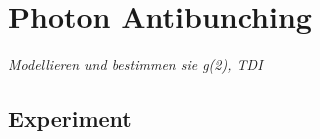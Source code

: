 

\chapter{Photon Antibunching}



\textit{Modellieren und bestimmen sie g(2), TDI
}
\section{Experiment}

 



\printbibliography[segment=\therefsegment,heading=subbibliography]
